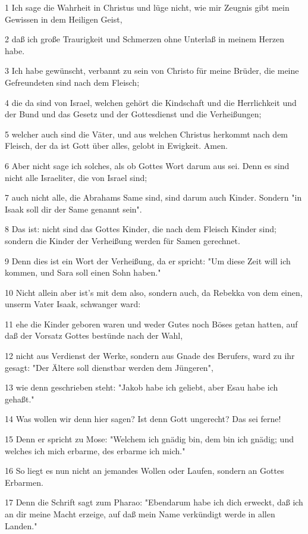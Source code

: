 \par 1 Ich sage die Wahrheit in Christus und lüge nicht, wie mir Zeugnis gibt mein Gewissen in dem Heiligen Geist,
\par 2 daß ich große Traurigkeit und Schmerzen ohne Unterlaß in meinem Herzen habe.
\par 3 Ich habe gewünscht, verbannt zu sein von Christo für meine Brüder, die meine Gefreundeten sind nach dem Fleisch;
\par 4 die da sind von Israel, welchen gehört die Kindschaft und die Herrlichkeit und der Bund und das Gesetz und der Gottesdienst und die Verheißungen;
\par 5 welcher auch sind die Väter, und aus welchen Christus herkommt nach dem Fleisch, der da ist Gott über alles, gelobt in Ewigkeit. Amen.
\par 6 Aber nicht sage ich solches, als ob Gottes Wort darum aus sei. Denn es sind nicht alle Israeliter, die von Israel sind;
\par 7 auch nicht alle, die Abrahams Same sind, sind darum auch Kinder. Sondern "in Isaak soll dir der Same genannt sein".
\par 8 Das ist: nicht sind das Gottes Kinder, die nach dem Fleisch Kinder sind; sondern die Kinder der Verheißung werden für Samen gerechnet.
\par 9 Denn dies ist ein Wort der Verheißung, da er spricht: "Um diese Zeit will ich kommen, und Sara soll einen Sohn haben."
\par 10 Nicht allein aber ist's mit dem also, sondern auch, da Rebekka von dem einen, unserm Vater Isaak, schwanger ward:
\par 11 ehe die Kinder geboren waren und weder Gutes noch Böses getan hatten, auf daß der Vorsatz Gottes bestünde nach der Wahl,
\par 12 nicht aus Verdienst der Werke, sondern aus Gnade des Berufers, ward zu ihr gesagt: "Der Ältere soll dienstbar werden dem Jüngeren",
\par 13 wie denn geschrieben steht: "Jakob habe ich geliebt, aber Esau habe ich gehaßt."
\par 14 Was wollen wir denn hier sagen? Ist denn Gott ungerecht? Das sei ferne!
\par 15 Denn er spricht zu Mose: "Welchem ich gnädig bin, dem bin ich gnädig; und welches ich mich erbarme, des erbarme ich mich."
\par 16 So liegt es nun nicht an jemandes Wollen oder Laufen, sondern an Gottes Erbarmen.
\par 17 Denn die Schrift sagt zum Pharao: "Ebendarum habe ich dich erweckt, daß ich an dir meine Macht erzeige, auf daß mein Name verkündigt werde in allen Landen."
